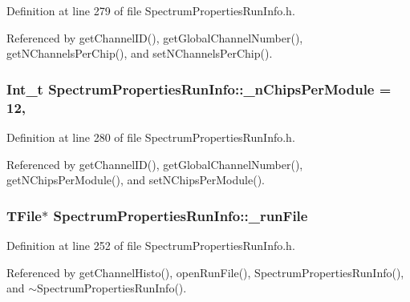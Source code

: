 Definition at line 279 of file Spectrum\-Properties\-Run\-Info.\-h.



Referenced by get\-Channel\-I\-D(), get\-Global\-Channel\-Number(), get\-N\-Channels\-Per\-Chip(), and set\-N\-Channels\-Per\-Chip().

\hypertarget{class_spectrum_properties_run_info_a67b550f7e4ba507ae8953f57c15f62f3}{
\subsubsection[{\-\_\-n\-Chips\-Per\-Module}]{\setlength{\rightskip}{0pt plus 5cm}Int\-\_\-t Spectrum\-Properties\-Run\-Info\-::\-\_\-n\-Chips\-Per\-Module = 12\hspace{0.3cm}{\ttfamily [static]}, {\ttfamily [protected]}}}\label{class_spectrum_properties_run_info_a67b550f7e4ba507ae8953f57c15f62f3}


Definition at line 280 of file Spectrum\-Properties\-Run\-Info.\-h.



Referenced by get\-Channel\-I\-D(), get\-Global\-Channel\-Number(), get\-N\-Chips\-Per\-Module(), and set\-N\-Chips\-Per\-Module().

\hypertarget{class_spectrum_properties_run_info_aab03a803b16b50f0d444f031b41ffebc}{
\subsubsection[{\-\_\-run\-File}]{\setlength{\rightskip}{0pt plus 5cm}T\-File$\ast$ Spectrum\-Properties\-Run\-Info\-::\-\_\-run\-File\hspace{0.3cm}{\ttfamily [protected]}}}\label{class_spectrum_properties_run_info_aab03a803b16b50f0d444f031b41ffebc}


Definition at line 252 of file Spectrum\-Properties\-Run\-Info.\-h.



Referenced by get\-Channel\-Histo(), open\-Run\-File(), Spectrum\-Properties\-Run\-Info(), and $\sim$\-Spectrum\-Properties\-Run\-Info().

